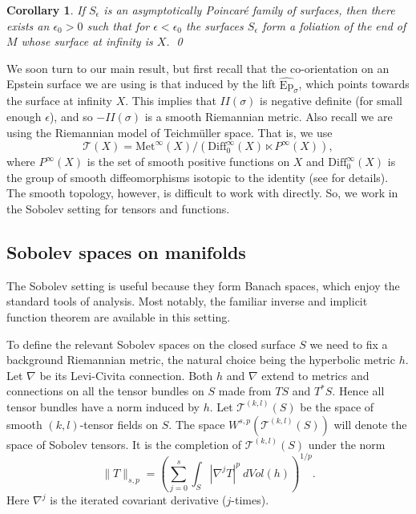 \documentclass{amsart}
\newtheorem{cor}[thm]{Corollary}
\newcommand{\two}{I\!\!I}
\begin{document}
\begin{cor}
\label{foliation}
If $S_\epsilon$ is an asymptotically Poincar\'e family of surfaces, then there exists an $\epsilon_0 > 0$ such that for $\epsilon < \epsilon_0$ the surfaces $S_\epsilon$ form a foliation of the end of $M$ whose surface at infinity is $X$.
\qed
\end{cor}



We soon turn to our main result, but first recall that the co-orientation on an Epstein surface we are using is that induced by the lift $\widehat{\mathrm{Ep}}_\sigma$, which points towards the surface at infinity $X$.
This implies that $\two(\sigma)$ is negative definite (for small enough $\epsilon$), and so $-\two(\sigma)$ is a smooth Riemannian metric. 
Also recall we are using the Riemannian model of Teichm\"uller space. 
That is, we use 
\[
\mathcal{T}(X) = \mathrm{Met}^\infty(X)/  \left( \mathrm{Diff}_0^\infty(X) \ltimes P^\infty(X) \right),
\]
where $P^\infty(X)$ is the set of smooth positive functions on $X$ and $\mathrm{Diff}_0^\infty(X)$ is the group of smooth diffeomorphisms isotopic to the identity (see \cite{tromba1992} for details). 
The smooth topology, however, is difficult to work with directly. 
So, we work in the Sobolev setting for tensors and functions.



\subsection{Sobolev spaces on manifolds} \label{sobolev}

The Sobolev setting is useful because they form Banach spaces, which enjoy the standard tools of analysis. Most notably, the familiar inverse and implicit function theorem are available in this setting.  

To define the relevant Sobolev spaces on the closed surface $S$ we need to fix a background Riemannian metric, the natural choice being the hyperbolic metric $h$. 
Let $\nabla$ be its Levi-Civita connection. 
Both $h$ and $\nabla$ extend to metrics and connections on all the tensor bundles on $S$ made from $TS$ and $T^*S$. 
Hence all tensor bundles have a norm induced by $h$. 
Let $\mathscr{T}^{(k,l)}(S)$ be the space of smooth $(k,l)$-tensor fields on $S$. 
The space $W^{s,p}(\mathscr{T}^{(k,l)}(S))$ will denote the space of Sobolev tensors. 
It is the completion of $\mathscr{T}^{(k,l)}(S)$ under the norm
\[
\|T\|_{s,p} = \left( \sum_{j = 0}^s \int_S | \nabla^j T|^p \ dVol(h) \right)^{1/p}.
\]
Here $\nabla^j$ is the iterated covariant derivative ($j$-times). 
\end{document}
